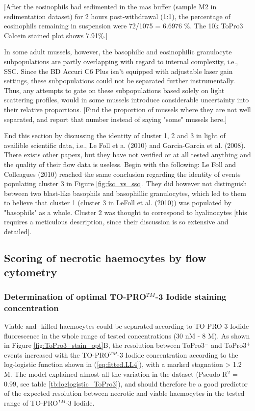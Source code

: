[After the eosinophils had sedimented in the \acrshort{mas} buffer (sample M2 in sedimentation dataset) for 2 hours post-withdrawal (1:1), the percentage of eosinophils remaining in suspension were 72/1075 = 6.6976 \%. The 10k ToPro3 Calcein stained plot shows 7.91\%.]
\newpage

In some adult mussels, however, the basophilic and eosinophilic granulocyte subpopulations are partly overlapping with regard to internal complexity, i.e., SSC. Since the BD Accuri C6 Plus isn't equipped with adjustable laser gain settings, these subpopulations could not be separated further instrumentally. Thus, any attempts to gate on these subpopulations based solely on light scattering profiles, would in some mussels introduce considerable uncertainty into their relative proportions. [Find the proportion of mussels where they are not well separated, and report that number instead of saying "some" mussels here.]

End this section by discussing the identity of cluster 1, 2 and 3 in light of availible scientific data, i.e., Le Foll et a. (2010) and Garcia-Garcia et al. (2008). There exists other papers, but they have not verified or at all tested anything and the quality of their flow data is useless. Begin with the following: Le Foll and Colleagues (2010) reached the same conclusion regarding the identity of events populating cluster 3 in Figure \ref{fig:fsc_vs_ssc}. They did however not distinguish between two blast-like basophils and basophillic granulocytes, which led to them to believe that cluster 1 (cluster 3 in LeFoll et al. (2010)) was populated by "basophils" as a whole. Cluster 2 was thought to correspond to hyalinocytes [this requires a meticulous description, since their discussion is so extensive and detailed].

\subsection{Scoring of necrotic haemocytes by flow cytometry}
\subsubsection{Determination of optimal TO-PRO$^{TM}$-3 Iodide staining concentration}
Viable and -killed haemocytes could be separated according to TO-PRO-3 Iodide fluorescence in the whole range of tested concentrations (30 nM - 8 \micro M). As shown in Figure \ref{fig:ToPro3_stain_opt}B, the resolution between ToPro3$^{-}$ and ToPro3$^{+}$ events increased with the TO-PRO$^{TM}$-3 Iodide concentration according to the log-logistic function shown in (\ref{eq:fitted.LL4}), with a marked stagnation > 1.2 \micro M. The model explained almost all the variation in the dataset (Pseudo-R$^{2}$ = 0.99, see table \ref{tb:loglogistic_ToPro3}), and should therefore be a good predictor of the expected resolution between necrotic and viable haemocytes in the tested range of TO-PRO$^{TM}$-3 Iodide.

